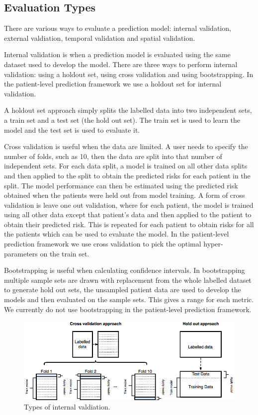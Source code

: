 \documentclass[11pt]{book}
\theoremstyle{definition}
\theoremstyle{definition}
\theoremstyle{definition}
\theoremstyle{remark}
\begin{document}
\hypertarget{evaluation-types}{%
\subsection{Evaluation Types}\label{evaluation-types}}

There are various ways to evaluate a prediction model: internal validation, external valdiation, temporal validation and spatial validation.

Internal validation is when a prediction model is evaluated using the same dataset used to develop the model. There are three ways to perform internal validation: using a holdout set, using cross validation and using bootstrapping. In the patient-level prediction framework we use a holdout set for internal validation.

A holdout set approach simply splits the labelled data into two independent sets, a train set and a test set (the hold out set). The train set is used to learn the model and the test set is used to evaluate it.

Cross validation is useful when the data are limited. A user needs to specify the number of folds, such as 10, then the data are split into that number of independent sets. For each data split, a model is trained on all other data splits and then applied to the split to obtain the predicted risks for each patient in the split. The model performance can then be estimated using the predicted risk obtained when the patients were held out from model training. A form of cross validation is leave one out validation, where for each patient, the model is trained using all other data except that patient's data and then applied to the patient to obtain their predicted risk. This is repeated for each patient to obtain risks for all the patients which can be used to evaluate the model. In the patient-level prediction framework we use cross validation to pick the optimal hyper-parameters on the train set.

Bootstrapping is useful when calculating confidence intervals. In bootstrapping multiple sample sets are drawn with replacement from the whole labelled dataset to generate hold out sets, the unsampled patient data are used to develop the models and then evaluated on the sample sets. This gives a range for each metric. We currently do not use bootstrapping in the patient-level prediction framework.

\begin{figure}
\includegraphics[width=1\linewidth]{images/PatientLevelPrediction/theory/validationTypes} \caption{Types of internal valdiation.}\label{fig:figuretheoryval}
\end{figure}
\end{document}
